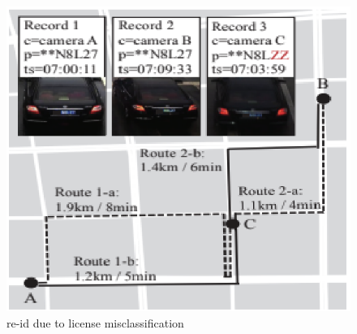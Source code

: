 \begin{figure}
\centering
  \includegraphics[width=0.5\linewidth]{figures/license-misclassification.eps}
  \caption{\ac{re-id} due to license misclassification \cite{tong2021large}}
  \label{fig:license-misclassification}
\end{figure}